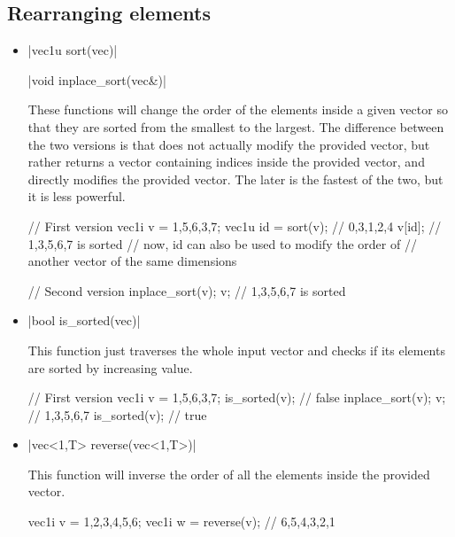\documentclass[12pt]{report}
\newenvironment{example}
{
    \begin{mdframed}[style=example,frametitle={Example}]
}
{
    \end{mdframed}
}
\begin{document}
\subsection{Rearranging elements}

\begin{itemize}
\item \cppinline|vec1u sort(vec)| 

\cppinline|void inplace_sort(vec&)| 

These functions will change the order of the elements inside a given vector so that they are sorted from the smallest to the largest. The difference between the two versions is that  does not actually modify the provided vector, but rather returns a vector containing indices inside the provided vector, and  directly modifies the provided vector. The later is the fastest of the two, but it is less powerful.

\begin{example}
\begin{cppcode}
// First version
vec1i v = {1,5,6,3,7};
vec1u id = sort(v); // {0,3,1,2,4}
v[id]; // {1,3,5,6,7} is sorted
// now, id can also be used to modify the order of
// another vector of the same dimensions

// Second version
inplace_sort(v);
v; // {1,3,5,6,7} is sorted
\end{cppcode}
\end{example}

\item \cppinline|bool is_sorted(vec)| 

This function just traverses the whole input vector and checks if its elements are sorted by increasing value.

\begin{example}
\begin{cppcode}
// First version
vec1i v = {1,5,6,3,7};
is_sorted(v); // false
inplace_sort(v);
v; // {1,3,5,6,7}
is_sorted(v); // true
\end{cppcode}
\end{example}

\item \cppinline|vec<1,T> reverse(vec<1,T>)| 

This function will inverse the order of all the elements inside the provided vector.

\begin{example}
\begin{cppcode}
vec1i v = {1,2,3,4,5,6};
vec1i w = reverse(v); // {6,5,4,3,2,1}
\end{cppcode}
\end{example}


\end{itemize}
\end{document}
